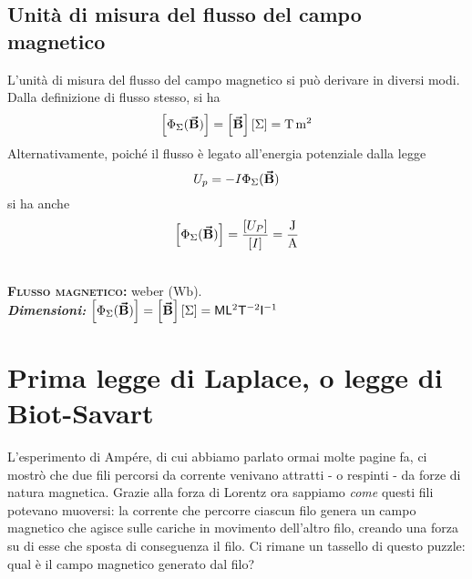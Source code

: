 \subsection{Unità di misura del flusso del campo magnetico}
L'unità di misura del flusso del campo magnetico si può derivare in diversi modi. Dalla definizione di flusso stesso, si ha
\begin{equation*}
	\left[\Phi_{\Sigma}(\vba{B})\right]=\left[\vba{B}\right]\left[\Sigma\right]=\unit[per-mode = fraction,exponent-product=\ensuremath{\cdot}]{\tesla\meter\squared}
\end{equation*}
Alternativamente, poiché il flusso è legato all'energia potenziale dalla legge
\begin{equation*}
	U_p=-I\Phi_{\Sigma}(\vb*{\va{B}})
\end{equation*}
si ha anche
\begin{equation*}
	\left[\Phi_{\Sigma}(\vba{B})\right]=\frac{\left[U_P\right]}{\left[I\right]}=\unit[per-mode = fraction,exponent-product=\ensuremath{\cdot}]{\joule\per\ampere}
\end{equation*}
\begin{units}~\\
	\textbf{\textsc{Flusso magnetico:}} weber ($\unit{\weber}$).\\
	\textit{\textbf{Dimensioni:}} $\left[\Phi_{\Sigma}(\vb*{\va{B}})\right]=\left[\vb*{\va{B}}\right]\left[\Sigma\right]=\mathsf{M}\mathsf{L}^2 \mathsf{T}^{-2}  \mathsf{I}^{-1}$
\end{units}
\section{Prima legge di Laplace, o legge di Biot-Savart}
L'esperimento di Ampére, di cui abbiamo parlato ormai molte pagine fa, ci mostrò che due fili percorsi da corrente venivano attratti - o respinti - da forze di natura magnetica. Grazie alla forza di Lorentz ora sappiamo \textit{come} questi fili potevano muoversi: la corrente che percorre ciascun filo genera un campo magnetico che agisce sulle cariche in movimento dell'altro filo, creando una forza su di esse che sposta di conseguenza il filo. Ci rimane un tassello di questo puzzle: qual è il campo magnetico generato dal filo?

